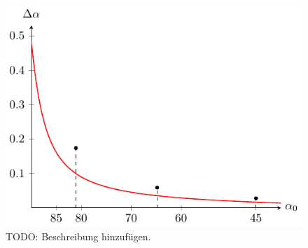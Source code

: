 \begin{refsection}
\begin{figure}
  \centering
  \includegraphics[scale=1]{licht/standalone/fig_real_comparison.pdf}
  \caption{TODO: Beschreibung hinzufügen. \label{fig:real_comparison}}
\end{figure}

\printbibliography[heading=subbibliography]
\end{refsection}
